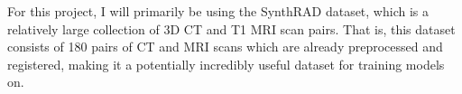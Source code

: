 For this project, I will primarily be using the SynthRAD\cite{synthradData} dataset, which is a relatively large collection of 3D CT and T1 MRI scan pairs. That is, this dataset consists of 180 pairs of CT and MRI scans which are already preprocessed and registered, making it a potentially incredibly useful dataset for training models on.
